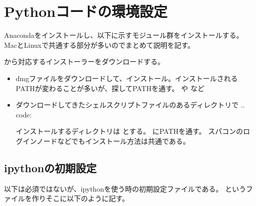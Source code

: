 \documentclass[letterpaper,10pt,dvipdfmx,report]{sphinxmanual}
\begin{document}
\section{Pythonコードの環境設定}
\label{\detokenize{environment:python}}
\sphinxAtStartPar
Anacondaをインストールし、以下に示すモジュール群をインストールする。
MacとLinuxで共通する部分が多いのでまとめて説明を記す。

\sphinxAtStartPar
{} から対応するインストーラーをダウンロードする。
\begin{itemize}
\item {} \begin{description}
\sphinxAtStartPar
dmgファイルをダウンロードして、インストール。インストールされるPATHが変わることが多いが、探してPATHを通す。  や  など

\end{description}

\item {} \begin{description}
\sphinxAtStartPar
ダウンロードしてきたシェルスクリプトファイルのあるディレクトリで
.. code:

\begin{sphinxVerbatim}[commandchars=\\\{\}]
 
\end{sphinxVerbatim}

\sphinxAtStartPar
インストールするディレクトリは  とする。
 にPATHを通す。
スパコンのログインノードなどでもインストール方法は共通である。

\end{description}

\end{itemize}


\subsection{ipythonの初期設定}
\label{\detokenize{environment:ipython}}
\sphinxAtStartPar
以下は必須ではないが、ipythonを使う時の初期設定ファイルである。
というファイルを作りそこに以下のように記す。
\end{document}
